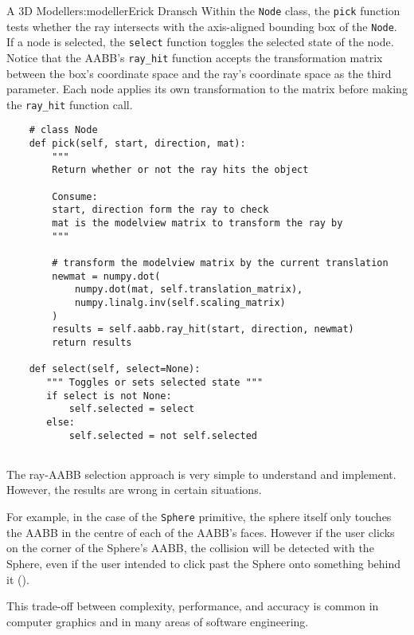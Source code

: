 \begin{aosachapter}{A 3D Modeller}{s:modeller}{Erick Dransch}
Within the \texttt{Node} class, the \texttt{pick} function tests whether
the ray intersects with the axis-aligned bounding box of the
\texttt{Node}. If a node is selected, the \texttt{select} function
toggles the selected state of the node. Notice that the AABB's
\texttt{ray\_hit} function accepts the transformation matrix between the
box's coordinate space and the ray's coordinate space as the third
parameter. Each node applies its own transformation to the matrix before
making the \texttt{ray\_hit} function call.

\begin{verbatim}
    # class Node
    def pick(self, start, direction, mat):
        """ 
        Return whether or not the ray hits the object

        Consume:  
        start, direction form the ray to check
        mat is the modelview matrix to transform the ray by 
        """

        # transform the modelview matrix by the current translation
        newmat = numpy.dot(
            numpy.dot(mat, self.translation_matrix), 
            numpy.linalg.inv(self.scaling_matrix)
        )
        results = self.aabb.ray_hit(start, direction, newmat)
        return results

    def select(self, select=None):
       """ Toggles or sets selected state """
       if select is not None:
           self.selected = select
       else:
           self.selected = not self.selected
    
\end{verbatim}

The ray-AABB selection approach is very simple to understand and
implement. However, the results are wrong in certain situations.


For example, in the case of the \texttt{Sphere} primitive, the sphere
itself only touches the AABB in the centre of each of the AABB's faces.
However if the user clicks on the corner of the Sphere's AABB, the
collision will be detected with the Sphere, even if the user intended to
click past the Sphere onto something behind it
().

This trade-off between complexity, performance, and accuracy is common
in computer graphics and in many areas of software engineering.

\label{modifying-scene-objects}


\end{aosachapter}
